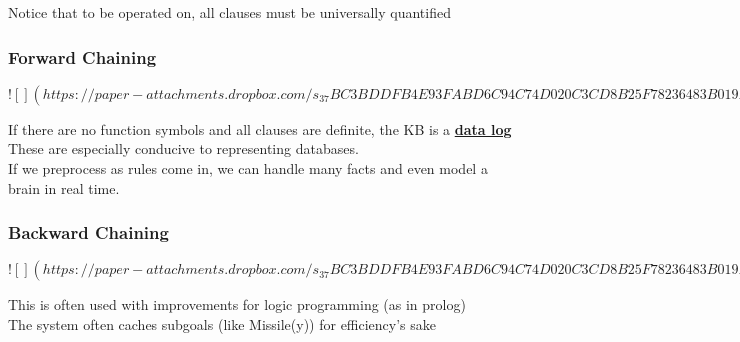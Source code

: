 \documentclass[../../lecture_notes.tex]{subfiles}
\begin{document}
\noindent Notice that to be operated on, all clauses must be universally quantified

\subsubsection*{Forward Chaining}
\newpage
$![](https://paper-attachments.dropbox.com/s_37BC3BDDFB4E93FABD6C94C74D020C3CD8B25F78236483B019E726793416E36E_1589436072359_Untitled+drawing+20.jpg)$
\newpage

\noindent If there are no function symbols and all clauses are definite, the KB is a \textbf{\underline{data log}}\\
\indent These are especially conducive to representing databases.\\
If we preprocess as rules come in, we can handle many facts and even model a brain in real time.\\

\subsubsection*{Backward Chaining}
\newpage
$![](https://paper-attachments.dropbox.com/s_37BC3BDDFB4E93FABD6C94C74D020C3CD8B25F78236483B019E726793416E36E_1589436972651_Untitled+drawing+21.jpg)$
\newpage

\noindent This is often used with improvements for logic programming (as in prolog)\\
The system often caches subgoals (like Missile(y)) for efficiency’s sake
\end{document}

